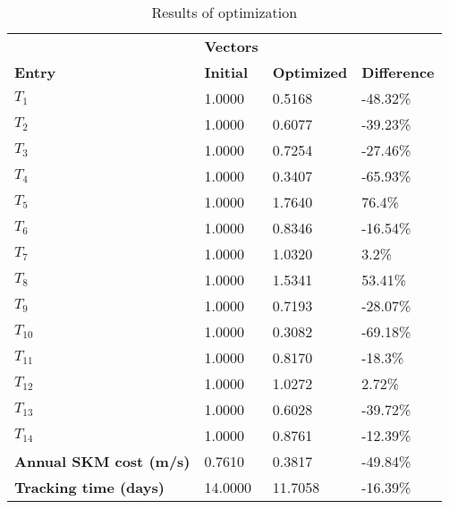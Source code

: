 \begin{table}[H]
\centering
\begin{tabular}{llll}
\textbf{}      & \cellcolor[HTML]{EFEFEF}\textbf{Vectors} & \textbf{} & \textbf{}         \\
\rowcolor[HTML]{EFEFEF} 
\textbf{Entry} & \textbf{Initial} & \textbf{Optimized} & \textbf{Difference} \\
$T_1$ & 1.0000 & 0.5168 & -48.32\% \\ 
$T_2$ & 1.0000 & 0.6077 & -39.23\% \\ 
$T_3$ & 1.0000 & 0.7254 & -27.46\% \\ 
$T_4$ & 1.0000 & 0.3407 & -65.93\% \\ 
$T_5$ & 1.0000 & 1.7640 & 76.4\% \\ 
$T_6$ & 1.0000 & 0.8346 & -16.54\% \\ 
$T_7$ & 1.0000 & 1.0320 & 3.2\% \\ 
$T_8$ & 1.0000 & 1.5341 & 53.41\% \\ 
$T_9$ & 1.0000 & 0.7193 & -28.07\% \\ 
$T_10$ & 1.0000 & 0.3082 & -69.18\% \\ 
$T_11$ & 1.0000 & 0.8170 & -18.3\% \\ 
$T_12$ & 1.0000 & 1.0272 & 2.72\% \\ 
$T_13$ & 1.0000 & 0.6028 & -39.72\% \\ 
$T_14$ & 1.0000 & 0.8761 & -12.39\% \\ 
\rowcolor[HTML]{EFEFEF} 
\textbf{Annual SKM cost (m/s)}  & 0.7610 & 0.3817 & -49.84\% \\ 
\rowcolor[HTML]{EFEFEF} 
\textbf{Tracking time (days)}  & 14.0000 & 11.7058 & -16.39\% \\ 
\end{tabular}
\caption{Results of optimization}
\label{tab:OptimizationAnalysis}
\end{table}